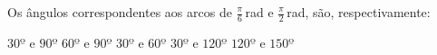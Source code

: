 Os ângulos correspondentes aos arcos de $\frac{\pi}{6}$\,rad e $\frac{\pi}{2}$\,rad, são, respectivamente:

$30º$ e $90º$
$60º$ e $90º$
$30º$ e $60º$
$30º$ e $120º$
$120º$ e $150º$


